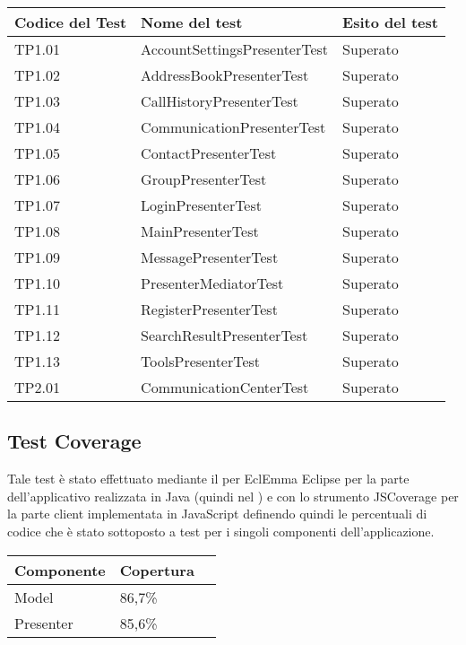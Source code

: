 \begin{center}
\begin{longtable}{lll}
\toprule Codice del Test & Nome del test  & Esito del test\\
\midrule

TP1.01 & AccountSettingsPresenterTest &Superato\\
TP1.02 & AddressBookPresenterTest &Superato\\
TP1.03 & CallHistoryPresenterTest &Superato\\
TP1.04 & CommunicationPresenterTest &Superato\\
TP1.05 & ContactPresenterTest &Superato\\
TP1.06 & GroupPresenterTest &Superato\\
TP1.07 & LoginPresenterTest &Superato\\
TP1.08 & MainPresenterTest &Superato\\
TP1.09 & MessagePresenterTest &Superato\\
TP1.10 & PresenterMediatorTest & Superato\\
TP1.11 & RegisterPresenterTest &Superato\\
TP1.12 & SearchResultPresenterTest &Superato\\
TP1.13 & ToolsPresenterTest &Superato\\
TP2.01 & CommunicationCenterTest & Superato\\

\bottomrule
\end{longtable}
\end{center}

\subsection{Test Coverage}
Tale test è stato effettuato mediante il  per EclEmma Eclipse  per la parte dell'applicativo realizzata in Java (quindi nel ) e con lo strumento JSCoverage per la parte client implementata in JavaScript definendo quindi le percentuali di codice che è stato sottoposto a test per i singoli componenti dell'applicazione.

\begin{center}
\begin{longtable}{p{}ll}
\toprule Componente & Copertura\\
\midrule
Model & 86,7\%\\
Presenter & 85,6\% \\
\bottomrule
\end{longtable}
\end{center}

